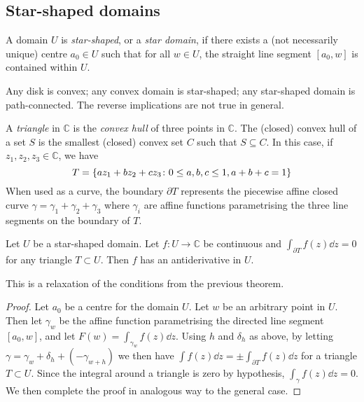 \subsection{Star-shaped domains}
\begin{definition}
	A domain \( U \) is \textit{star-shaped}, or a \textit{star domain}, if there exists a (not necessarily unique) centre \( a_0 \in U \) such that for all \( w \in U \), the straight line segment \( [a_0, w] \) is contained within \( U \).
\end{definition}
\begin{remark}
	Any disk is convex; any convex domain is star-shaped; any star-shaped domain is path-connected.
	The reverse implications are not true in general.
\end{remark}
\begin{definition}
	A \textit{triangle} in \( \mathbb C \) is the \textit{convex hull} of three points in \( \mathbb C \).
	The (closed) convex hull of a set \( S \) is the smallest (closed) convex set \( C \) such that \( S \subseteq C \).
	In this case, if \( z_1, z_2, z_3 \in \mathbb C \), we have
	\[ T = \qty{az_1 + bz_2 + cz_3 \colon 0 \leq a,b,c \leq 1, a+b+c=1} \]
	When used as a curve, the boundary \( \partial T \) represents the piecewise affine closed curve \( \gamma = \gamma_1 + \gamma_2 + \gamma_3 \) where \( \gamma_i \) are affine functions parametrising the three line segments on the boundary of \( T \).
\end{definition}
\begin{corollary}
	Let \( U \) be a star-shaped domain.
	Let \( f \colon U \to \mathbb C \) be continuous and \( \int_{\partial T} f(z) \dd{z} = 0 \) for any triangle \( T \subset U \).
	Then \( f \) has an antiderivative in \( U \).
\end{corollary}
\begin{remark}
	This is a relaxation of the conditions from the previous theorem.
\end{remark}
\begin{proof}
	Let \( a_0 \) be a centre for the domain \( U \).
	Let \( w \) be an arbitrary point in \( U \).
	Then let \( \gamma_w \) be the affine function parametrising the directed line segment \( [a_0,w] \), and let \( F(w) = \int_{\gamma_w} f(z) \dd{z} \).
	Using \( h \) and \( \delta_h \) as above, by letting \( \gamma = \gamma_w + \delta_h + (-\gamma_{w+h}) \) we then have \( \int f(z) \dd{z} = \pm \int_{\partial T} f(z) \dd{z} \) for a triangle \( T \subset U \).
	Since the integral around a triangle is zero by hypothesis, \( \int_\gamma f(z) \dd{z} = 0 \).
	We then complete the proof in analogous way to the general case.
\end{proof}
